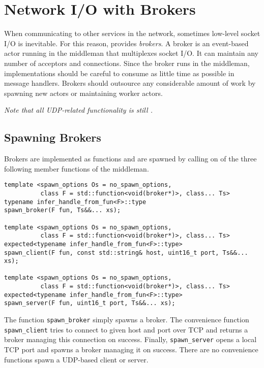 \section{Network I/O with Brokers}
\label{broker}

When communicating to other services in the network, sometimes low-level socket
I/O is inevitable. For this reason, \lib provides \emph{brokers}. A broker is
an event-based actor running in the middleman that multiplexes socket I/O. It
can maintain any number of acceptors and connections. Since the broker runs in
the middleman, implementations should be careful to consume as little time as
possible in message handlers. Brokers should outsource any considerable amount
of work by spawning new actors or maintaining worker actors.

\textit{Note that all UDP-related functionality is still \experimental.}

\subsection{Spawning Brokers}

Brokers are implemented as functions and are spawned by calling on of the three
following member functions of the middleman.

\begin{lstlisting}
template <spawn_options Os = no_spawn_options,
          class F = std::function<void(broker*)>, class... Ts>
typename infer_handle_from_fun<F>::type
spawn_broker(F fun, Ts&&... xs);

template <spawn_options Os = no_spawn_options,
          class F = std::function<void(broker*)>, class... Ts>
expected<typename infer_handle_from_fun<F>::type>
spawn_client(F fun, const std::string& host, uint16_t port, Ts&&... xs);

template <spawn_options Os = no_spawn_options,
          class F = std::function<void(broker*)>, class... Ts>
expected<typename infer_handle_from_fun<F>::type>
spawn_server(F fun, uint16_t port, Ts&&... xs);
\end{lstlisting}

The function \lstinline^spawn_broker^ simply spawns a broker. The convenience
function \lstinline^spawn_client^ tries to connect to given host and port over
TCP and returns a broker managing this connection on success. Finally,
\lstinline^spawn_server^ opens a local TCP port and spawns a broker managing it
on success. There are no convenience functions spawn a UDP-based client or
server.

